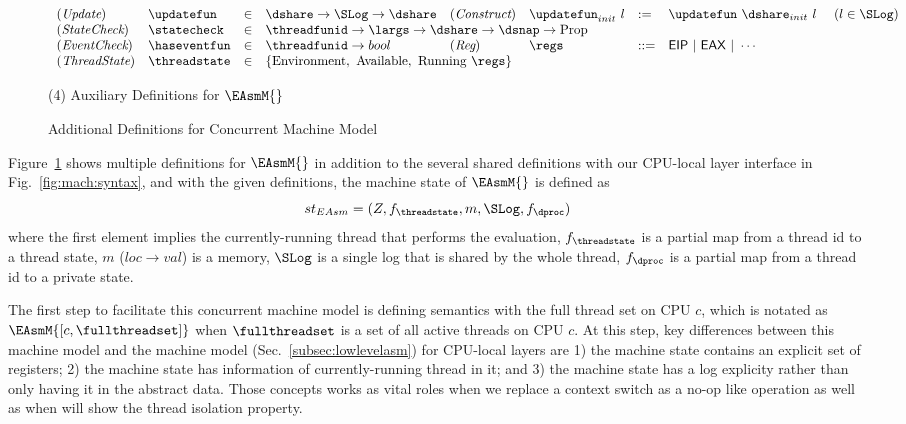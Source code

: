 \begin{figure}
\begin{small}
\[
\begin{array}{llllllll}
(\textit{Update}) & \updatefun & \in & \dshare \rightarrow \SLog \rightarrow \dshare &
(\textit{Construct}) & \updatefun_{init} \ l& := & \updatefun\ \dshare_{init} \ l  \ \ \ \ (l \in \SLog) \\
(\textit{StateCheck}) & \statecheck & \in &
\multicolumn{5}{l}{
 \threadfunid \rightarrow \largs \rightarrow \dshare \rightarrow \dsnap \rightarrow \mathrm{Prop}
 }
 \\
 (\textit{EventCheck}) & \haseventfun & \in & \threadfunid \rightarrow bool  &
(\textit{Reg})  &\regs & ::= & \mathsf{EIP} \ | \ \mathsf{EAX} \ | \  \cdots \\
(\textit{ThreadState}) & \threadstate & \in &
\multicolumn{5}{l}{
 \{\mathrm{Environment}, \ \mathrm{Available}, \ \mathrm{Running}\ \regs \} 
  }
\end{array}
\]
\begin{center}
(4) Auxiliary Definitions for $\EAsmM{}$
\end{center}

\end{small}
\caption{Additional Definitions for Concurrent Machine Model}
\label{fig:mach:thread-syntax}
\end{figure}
Figure~\ref{fig:mach:thread-syntax} shows multiple definitions for $\EAsmM{}$ in addition to the several 
shared definitions with our CPU-local layer interface in Fig.~\ref{fig:mach:syntax}, and
with the given definitions, the machine state of $\EAsmM{}$ is defined as
$$st_{EAsm} = (Z, f_{\threadstate}, m, \SLog, f_{\dproc})$$ 
where the first element implies the currently-running thread that performs the evaluation, 
$f_{\threadstate}$ is a partial map from a thread id to a thread state, 
$m$ ($loc \rightarrow val$) is a memory, $\SLog$ is a single log that is shared by the whole thread, 
$f_{\dproc}$ is a partial map from a thread id to a private state.

The first step to facilitate this concurrent machine model is defining semantics with the full thread set on CPU $c$,
which is notated as $\EAsmM{[c, \fullthreadset]}$ when $\fullthreadset$ is a set of all active threads on CPU $c$.
At this step, key differences between this machine model and the machine model 
(Sec.~\ref{subsec:lowlevelasm}) for CPU-local layers are
1) the machine state contains an explicit set of registers;
2) the machine state has  information of currently-running thread in it; and 
3) the machine state has a log explicity rather than only having it in the abstract data. 
Those concepts works as vital roles when we replace a context switch as a no-op like operation as well as
when will show the thread isolation property.

